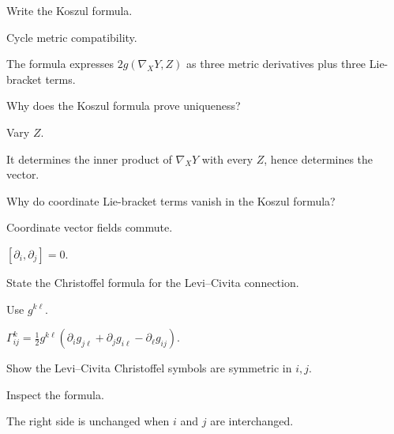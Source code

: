 \begin{exercise}\label{exr:vii22-06}
Write the Koszul formula.
\end{exercise}
\begin{hint}
Cycle metric compatibility.
\end{hint}
\begin{solution}
The formula expresses \(2g(\nabla_XY,Z)\) as three metric derivatives plus three Lie-bracket terms.
\end{solution}


\begin{exercise}\label{exr:vii22-07}
Why does the Koszul formula prove uniqueness?
\end{exercise}
\begin{hint}
Vary \(Z\).
\end{hint}
\begin{solution}
It determines the inner product of \(\nabla_XY\) with every \(Z\), hence determines the vector.
\end{solution}


\begin{exercise}\label{exr:vii22-08}
Why do coordinate Lie-bracket terms vanish in the Koszul formula?
\end{exercise}
\begin{hint}
Coordinate vector fields commute.
\end{hint}
\begin{solution}
\([\partial_i,\partial_j]=0\).
\end{solution}


\begin{exercise}\label{exr:vii22-09}
State the Christoffel formula for the Levi--Civita connection.
\end{exercise}
\begin{hint}
Use \(g^{k\ell}\).
\end{hint}
\begin{solution}
\(\Gamma^k_{ij}=\frac12g^{k\ell}(\partial_i g_{j\ell}+\partial_jg_{i\ell}-\partial_\ell g_{ij})\).
\end{solution}


\begin{exercise}\label{exr:vii22-10}
Show the Levi--Civita Christoffel symbols are symmetric in \(i,j\).
\end{exercise}
\begin{hint}
Inspect the formula.
\end{hint}
\begin{solution}
The right side is unchanged when \(i\) and \(j\) are interchanged.
\end{solution}


